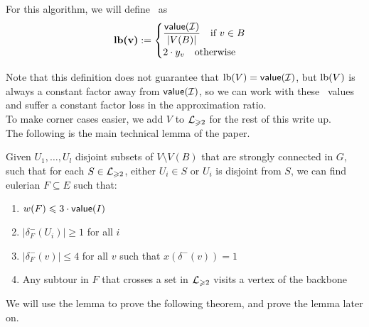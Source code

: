 \documentclass[./main.tex]{subfiles}
\begin{document}
		\begin{definition}
			For this algorithm, we will define \lb\ as 
			\[
				\textbf{\textup{lb}(v)}:=
				\begin{cases}
					\dfrac{\textsf{\textup{value}}(\mathcal{I})}{|V(B)|}\quad \text{if }v\in B \\
					2\cdot y_v\quad \text{otherwise}
				\end{cases}
			\]
		\end{definition}
		
		Note that this definition does not guarantee that $\textup{lb}(V) = \textsf{\textup{value}}(\mathcal{I})$, but $\textup{lb}(V)$ is always a constant factor away from $\textsf{\textup{value}}(\mathcal{I})$, so we can work with these \lb\ values and suffer a constant factor loss in the approximation ratio.\\
		
		To make corner cases easier, we add $V$ to $\mathcal{L}_{\geqslant 2}$ for the rest of this write up.\\
		
		The following is the main technical lemma of the paper. \vspace{1mm}
		\begin{lemma}\label{lemma7}
			Given $U_1,\ldots,U_l$ disjoint subsets of $V\setminus V(B)$ that are strongly connected in $G$, such that for each $S\in \mathcal{L}_{\geqslant 2}$, either $U_i\in S$ or $U_i$ is disjoint from $S$, we can find eulerian $F\subseteq E$ such that:
			\begin{enumerate}[(1)]
				\item $w(F)\leqslant 3\cdot \textsf{\textup{value}}(I)$
				\item $|\delta^-_F(U_i)|\geqslant 1$ for all $i$
				\item $|\delta^-_F(v)|\leqslant 4$ for all $v$ such that $x(\delta^-(v)) = 1$
				\item Any subtour in $F$ that crosses a set in $\mathcal{L}_{\geqslant 2}$ visits a vertex of the backbone\\
			\end{enumerate}
		\end{lemma}
		
		We will use the lemma to prove the following theorem, and prove the lemma later on.\\
		
\end{document}
